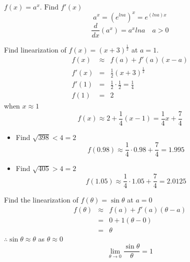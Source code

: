 \begin{eg}
$f(x) = a^x. \text{ Find } f'(x)$
$$a^x = (e^{ln a})^x = e^{(ln a)x}$$
$$\displaystyle \frac{d}{dx} (a^x) = a^x ln a \quad a>0$$
\end{eg}
\begin{eg}
Find linearization of $f(x) = (x+3)^{\frac{1}{2}}$ at $a=1$.\\
$$\begin{array}{rcl}
f(x) & \approx & f(a) + f'(a)(x-a)\\
f'(x) & = & \displaystyle \frac{1}{2}(x+3)^{\frac{1}{2}}\\
f'(1) & = & \displaystyle \frac{1}{2} \cdot \frac{1}{2} = \frac{1}{4}\\
f(1) & = & 2
\end{array}$$
when $x \approx 1$
$$\displaystyle f(x) \approx 2+ \frac{1}{4} (x-1) = \frac{1}{4} x + \frac{7}{4}$$
\begin{itemize}
\item Find $\sqrt{398} < 4 = 2$\\
$$\displaystyle f(0.98) \approx \frac{1}{4} \cdot 0.98 + \frac{7}{4} = 1.995$$
\item Find $\sqrt{405} > 4 = 2$\\
$$\displaystyle f(1.05) \approx \frac{1}{4} \cdot 1.05 + \frac{7}{4} = 2.0125$$
\end{itemize}
\end{eg}
\begin{eg}
Find the linearization of $f(\theta) = \sin \theta$ at $a = 0$\\
$$\begin{array}{rcl}
f(\theta) & \approx & f(a) + f'(a)(\theta -a)\\
& = & 0+1(\theta -0)\\
& = & \theta
\end{array}$$
$\therefore \sin \theta \approx \theta$ as $\theta \approx 0$
$$\displaystyle \lim_{\theta \to 0} \frac{\sin \theta}{\theta} = 1$$
\end{eg}

